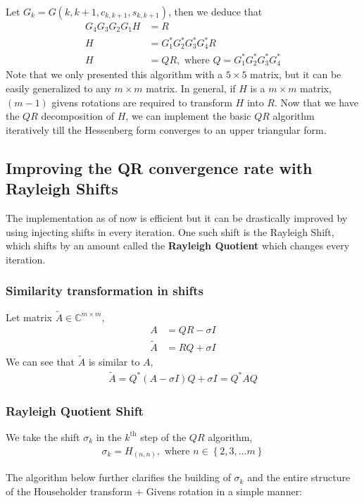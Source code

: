 \documentclass[12pt]{article}
\numberwithin{equation}{section}
\newcommand{\brak}[1]{\ensuremath{\left(#1\right)}}
\newcommand{\cbrak}[1]{\ensuremath{\left\{#1\right\}}}
\newcommand{\defmat}[2]{#1\in\mathbb{C}^{#2\times#2}}
\begin{document}
Let $G_k = G\brak{k, k + 1, c_{k, k+1}, s_{k, k+1}}$, then we deduce that
\begin{align}
    G_4 G_3 G_2 G_1 H &= R\\
    H &= G_1^{\ast} G_2^{\ast} G_3^{\ast} G_4^{\ast} R\\
    H &= QR, \text{ where } Q = G_1^{\ast} G_2^{\ast} G_3^{\ast} G_4^{\ast}
\end{align}
Note that we only presented this algorithm with a $5\times 5$ matrix, but it can be easily generalized to any $m\times m$ matrix.
In general, if $H$ is a $m\times m$ matrix, $\brak{m - 1}$ givens rotations are required to transform $H$ into $R$.
\newline
Now that we have the $QR$ decomposition of $H$, we can implement the basic $QR$ algorithm iteratively till the Hessenberg form converges to an upper triangular form.

\subsection{Improving the QR convergence rate with Rayleigh Shifts}
The implementation as of now is efficient but it can be drastically improved by using injecting shifts in every iteration.
One such shift is the Rayleigh Shift, which shifts by an amount called the \textbf{Rayleigh Quotient} which changes every iteration.
\subsubsection{Similarity transformation in shifts}
Let matrix $\defmat{\tilde{A}}{m}$, 
\begin{align}
    A &= QR - \sigma I\\
    \tilde{A} &= RQ + \sigma I
\end{align}
We can see that $\tilde{A}$ is similar to $A$,
\begin{align}
    \tilde{A} = Q^{\ast}\brak{A - \sigma I}Q + \sigma I = Q^{\ast}AQ
\end{align}
\subsubsection{Rayleigh Quotient Shift}
We take the shift $\sigma_k$ in the $k^{\text{th}}$ step of the $QR$ algorithm,
\begin{align}
   \sigma_k = H_{\brak{n, n}}, \text{ where } n \in \cbrak{2, 3, \dots m}
\end{align}

The algorithm below further clarifies the building of $\sigma_k$ and the entire structure of the Householder transform + Givens rotation in a simple manner: 
\end{document}
